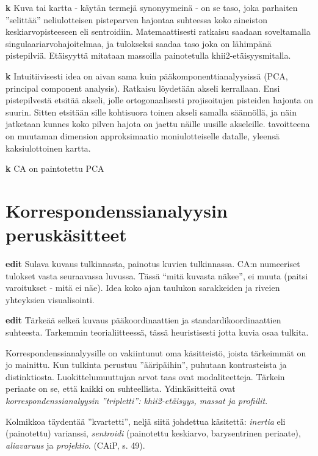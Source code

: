 \documentclass[
  finnish,
]{book}
\begin{document}
\textbf{k} Kuva tai kartta - käytän termejä synonyymeinä - on se taso, joka parhaiten
''selittää'' neliulotteisen pisteparven hajontaa suhteessa koko aineiston
keskiarvopisteeseen eli sentroidiin. Matemaattisesti ratkaisu saadaan
soveltamalla singulaariarvohajoitelmaa, ja tulokseksi saadaa taso joka on
lähimpänä pistepilviä. Etäisyyttä mitataan massoilla painotetulla
khii2-etäisyysmitalla.

\textbf{k} Intuitiivisesti idea on aivan sama kuin pääkomponenttianalyysissä
(PCA, principal component analysis). Ratkaisu löydetään akseli kerrallaan.
Ensi pistepilvestä etsitää akseli, jolle ortogonaalisesti projisoitujen
pisteiden hajonta on suurin. Sitten etsitään sille kohtisuora toinen akseli
samalla säännöllä, ja näin jatketaan kunnes koko pilven hajota on jaettu näille
uusille akseleille. tavoitteena on muutaman dimension approksimaatio
moniulotteiselle datalle, yleensä kaksiulottoinen kartta.

\textbf{k} CA on paintotettu PCA

\hypertarget{korrespondenssianalyysin-peruskuxe4sitteet}{%
\section{Korrespondenssianalyysin peruskäsitteet}\label{korrespondenssianalyysin-peruskuxe4sitteet}}

\textbf{edit} Sulava kuvaus tulkinnasta, painotus kuvien tulkinnassa. CA:n numeeriset
tulokset vasta seuraavassa luvussa. Tässä ``mitä kuvasta näkee'', ei muuta (paitsi
varoitukset - mitä ei näe). Idea koko ajan taulukon sarakkeiden ja riveien yhteyksien
visualisointi.

\textbf{edit} Tärkeää selkeä kuvaus pääkoordinaattien ja standardikoordinaattien
suhteesta. Tarkemmin teorialiitteessä, tässä heuristisesti jotta kuvia osaa tulkita.

Korrespondenssianalyysille on vakiintunut oma käsitteistö, joista tärkeimmät on
jo mainittu. Kun tulkinta perustuu ''ääripäihin'', puhutaan kontrasteista ja
distinktiosta. Luokittelumuuttujan arvot taas ovat modaliteetteja.
Tärkein periaate on se, että kaikki on suhteellista. Ydinkäsitteitä ovat
\emph{korrespondenssianalyysin ''tripletti'': khii2-etäisyys, massat ja profiilit}.

Kolmikkoa täydentää ''kvartetti'', neljä siitä johdettua käsitettä: \emph{inertia} eli
(painotettu) varianssi, \emph{sentroidi} (painotettu keskiarvo, barysentrinen periaate),
\emph{aliavaruus} ja \emph{projektio}. (CAiP, s. 49).
\end{document}

